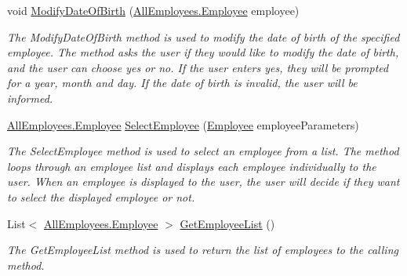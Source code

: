 \begin{DoxyCompactItemize}
void \hyperlink{class_the_company_1_1_container_ab031c4984b46f0bf58388860dd2a8d7a}{Modify\+Date\+Of\+Birth} (\hyperlink{class_all_employees_1_1_employee}{All\+Employees.\+Employee} employee)
\begin{DoxyCompactList}\small\item\em The Modify\+Date\+Of\+Birth method is used to modify the date of birth of the specified employee. The method asks the user if they would like to modify the date of birth, and the user can choose yes or no. If the user enters yes, they will be prompted for a year, month and day. If the date of birth is invalid, the user will be informed. \end{DoxyCompactList}\item 
\hyperlink{class_all_employees_1_1_employee}{All\+Employees.\+Employee} \hyperlink{class_the_company_1_1_container_a13074c7cb38cf312063d4dd63bb4f558}{Select\+Employee} (\hyperlink{class_all_employees_1_1_employee}{Employee} employee\+Parameters)
\begin{DoxyCompactList}\small\item\em The Select\+Employee method is used to select an employee from a list. The method loops through an employee list and displays each employee individually to the user. When an employee is displayed to the user, the user will decide if they want to select the displayed employee or not. \end{DoxyCompactList}\item 
List$<$ \hyperlink{class_all_employees_1_1_employee}{All\+Employees.\+Employee} $>$ \hyperlink{class_the_company_1_1_container_aad575168cb564c26eaa9a9722f425f23}{Get\+Employee\+List} ()
\begin{DoxyCompactList}\small\item\em The Get\+Employee\+List method is used to return the list of employees to the calling method. \end{DoxyCompactList}\end{DoxyCompactItemize}
